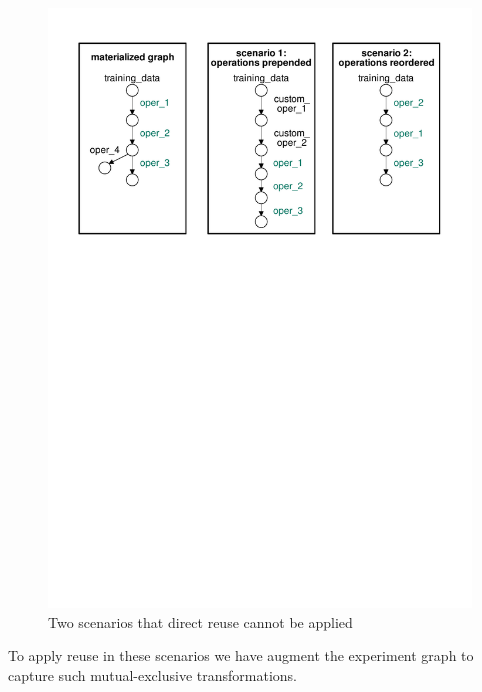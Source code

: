 \begin{figure}
\centering
\includegraphics[width=\columnwidth]{../images/unaligned-operations}
\caption{Two scenarios that direct reuse cannot be applied}
\label{fig-unaligned-operations}
\end{figure}

To apply reuse in these scenarios we have augment the experiment graph to capture such mutual-exclusive transformations.

